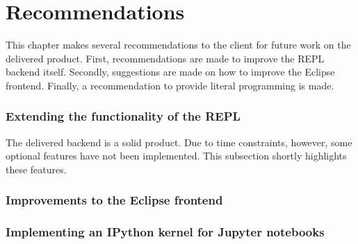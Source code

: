 \chapter{Recommendations}
\label{cha:recommendations}

This chapter makes several recommendations to the client for future work on the
delivered product. First, recommendations are made to improve the REPL backend
itself. Secondly, suggestions are made on how to improve the Eclipse frontend.
Finally, a recommendation to provide literal programming is made.

\subsection{Extending the functionality of the REPL}
\label{ssec:impr-backend}

The delivered backend is a solid product. Due to time constraints, however, some
optional features have not been implemented. This subsection shortly highlights
these features.





\subsection{Improvements to the Eclipse frontend}
\label{ssec:impr-eclipse}



\subsection{Implementing an IPython kernel for Jupyter notebooks}
\label{ssec:discuss-literate-programming}



